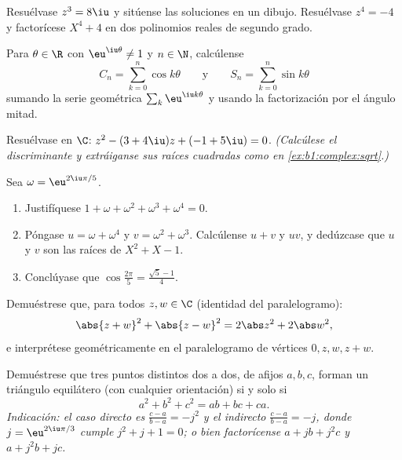 \begin{exercise}[$\star$]\label{exo:b1:complex:5}
Resuélvase $z^3 = 8\iu$ y sitúense las soluciones en un dibujo.
Resuélvase $z^4 = -4$ y factorícese $X^4 + 4$ en dos polinomios reales de segundo grado.
\end{exercise}

\begin{exercise}[$\star\star$]\label{exo:b1:complex:6}
Para $\theta \in \R$ con $\eu^{\iu\theta} \neq 1$ y $n \in \N$,
calcúlense
\[
C_n = \sum_{k=0}^{n} \cos k\theta
\qquad\text{y}\qquad
S_n = \sum_{k=0}^{n} \sin k\theta
\]
sumando la serie geométrica $\sum_k \eu^{\iu k\theta}$ y usando la
factorización por el ángulo mitad.
\end{exercise}

\begin{exercise}[$\star\star$]\label{exo:b1:complex:7}
Resuélvase en $\C$: $z^2 - (3 + 4\iu) z + (-1 + 5\iu) = 0$.
\emph{(Calcúlese el discriminante y extráiganse sus raíces cuadradas
como en \cref{ex:b1:complex:sqrt}.)}
\end{exercise}

\begin{exercise}[$\star\star$]\label{exo:b1:complex:8}
Sea $\omega = \eu^{2\iu\pi/5}$.
\begin{enumerate}
  \item Justifíquese $1 + \omega + \omega^2 + \omega^3 + \omega^4 = 0$.
  \item Póngase $u = \omega + \omega^4$ y $v = \omega^2 + \omega^3$.
        Calcúlense $u + v$ y $uv$, y dedúzcase que $u$ y $v$ son las
        raíces de $X^2 + X - 1$.
  \item Conclúyase que $\cos\frac{2\pi}{5} = \frac{\sqrt 5 - 1}{4}$.
\end{enumerate}
\end{exercise}

\begin{exercise}[$\star\star$]\label{exo:b1:complex:9}
Demuéstrese que, para todos $z, w \in \C$ (identidad del paralelogramo):
\[
\abs{z + w}^2 + \abs{z - w}^2 = 2\abs z^2 + 2\abs w^2 ,
\]
e interprétese geométricamente en el paralelogramo de vértices $0, z,
w, z + w$.
\end{exercise}

\begin{exercise}[$\star\star\star$]\label{exo:b1:complex:10}
Demuéstrese que tres puntos distintos dos a dos, de afijos $a, b, c$,
forman un triángulo equilátero (con cualquier orientación) si y solo si
\[
a^2 + b^2 + c^2 = ab + bc + ca .
\]
\emph{Indicación: el caso directo es $\frac{c-a}{b-a} = -j^2$ y el
indirecto $\frac{c-a}{b-a} = -j$, donde $j = \eu^{2\iu\pi/3}$ cumple
$j^2 + j + 1 = 0$; o bien factorícense $a + jb + j^2c$ y $a + j^2 b
+ jc$.}
\end{exercise}

